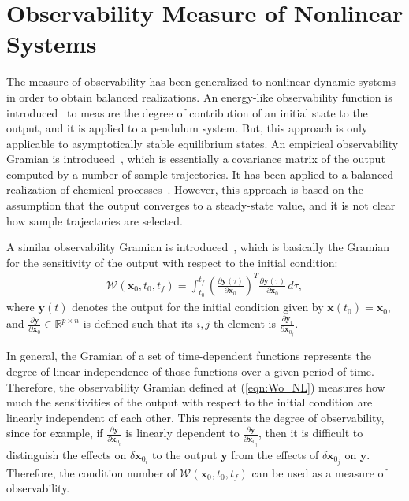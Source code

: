 \documentclass[letterpaper, paper,10pt]{AAS}		%
\newcommand{\parenth}[1]{\ensuremath{\left( #1 \right)}}
\newcommand{\refeqn}[1]{(\ref{eqn:#1})}
\newcommand{\deriv}[2]{\ensuremath{\frac{\partial #1}{\partial #2}}}
\renewcommand{\Re}{\ensuremath{\mathbb{R}}}
\newcommand{\x}{\ensuremath{\mathbf{x}}}
\newcommand{\y}{\mathbf{y}}
\begin{document}
\section{Observability Measure of Nonlinear Systems}

The measure of observability has been generalized to nonlinear dynamic systems in order to obtain balanced realizations.
An energy-like observability function is introduced~\cite{SchSCL93,Sch94,NewKriPICDC98} to measure the degree of contribution of an initial state to the output, and it is applied to a pendulum system. But, this approach is only applicable to asymptotically stable equilibrium states. An empirical observability Gramian is introduced~\cite{LalMarPIWC99,LalMarIJRNC02}, which is essentially a covariance matrix of the output computed by a number of sample trajectories.
It has been applied to a balanced realization of chemical processes~\cite{HahEdgJPC03,HahEdgCCE02}. However, this approach is based on the assumption that the output converges to a steady-state value, and it is not clear how  sample trajectories are selected. 

A similar observability Gramian is introduced~\cite{KreIdePICDC09}, which is basically the Gramian for the sensitivity of the output with respect to the initial condition:
\begin{align}
\mathcal{W} (\x_0,t_0,t_f) = \int_{t_0}^{t_f} \parenth{\deriv{\y(\tau)}{\x_0}}^T\deriv{\y(\tau)}{\x_0}\,d\tau,\label{eqn:Wo_NL}
\end{align}
where $\y(t)$ denotes the output for the initial condition given by $\x(t_0)=\x_0$, and $\deriv{\y}{\x_0}\in\Re^{p\times n}$ is defined such that its $i,j$-th element is $\deriv{\y_i}{\x_{0_j}}$. 

In general, the Gramian of a set of time-dependent functions represents the degree of linear independence of those functions over a given period of time. Therefore, the observability Gramian defined at \refeqn{Wo_NL} measures how much the sensitivities of the output with respect to the initial condition are linearly independent of each other. This represents the degree of observability, since for example, if $\deriv{\y}{\x_{0_i}}$ is linearly dependent to $\deriv{\y}{\x_{0_j}}$, then it is difficult to distinguish the effects on $\delta \x_{0_i}$ to the output $\y$ from the effects of $\delta \x_{0_j}$ on $\y$. Therefore, the condition number of $\mathcal{W} (\x_0,t_0,t_f)$ can be used as a measure of observability. 

\end{document}
